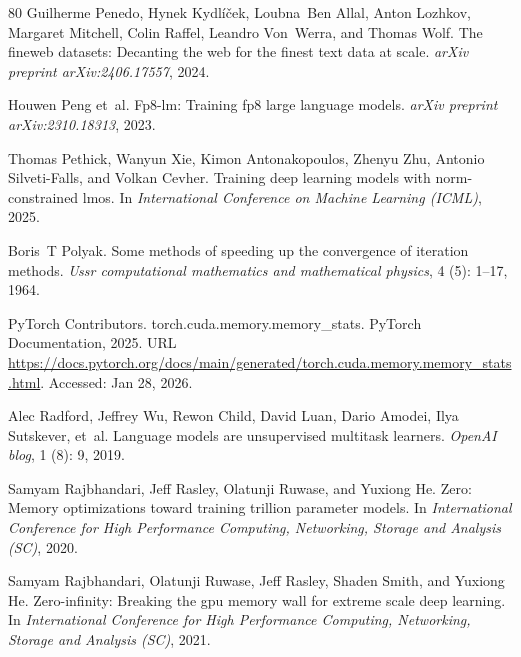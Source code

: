 \documentclass[10pt,twocolumn,letterpaper]{article}
\theoremstyle{plain}
\theoremstyle{definition}
\theoremstyle{remark}
\begin{document}
{\begin{thebibliography}{80}
Guilherme Penedo, Hynek Kydl{\'{i}}{\v{c}}ek, Loubna~Ben Allal, Anton Lozhkov,
  Margaret Mitchell, Colin Raffel, Leandro Von~Werra, and Thomas Wolf.
\newblock The fineweb datasets: Decanting the web for the finest text data at
  scale.
\newblock \emph{arXiv preprint arXiv:2406.17557}, 2024.

Houwen Peng et~al.
\newblock Fp8-lm: Training fp8 large language models.
\newblock \emph{arXiv preprint arXiv:2310.18313}, 2023.

Thomas Pethick, Wanyun Xie, Kimon Antonakopoulos, Zhenyu Zhu, Antonio
  Silveti-Falls, and Volkan Cevher.
\newblock Training deep learning models with norm-constrained lmos.
\newblock In \emph{International Conference on Machine Learning (ICML)}, 2025.

Boris~T Polyak.
\newblock Some methods of speeding up the convergence of iteration methods.
\newblock \emph{Ussr computational mathematics and mathematical physics},
  4 (5): 1--17, 1964.

{PyTorch Contributors}.
\newblock torch.cuda.memory.memory\_stats.
\newblock PyTorch Documentation, 2025.
\newblock URL
  \url{https://docs.pytorch.org/docs/main/generated/torch.cuda.memory.memory_stats.html}.
\newblock Accessed: Jan 28, 2026.

Alec Radford, Jeffrey Wu, Rewon Child, David Luan, Dario Amodei, Ilya
  Sutskever, et~al.
\newblock Language models are unsupervised multitask learners.
\newblock \emph{OpenAI blog}, 1 (8): 9, 2019.

Samyam Rajbhandari, Jeff Rasley, Olatunji Ruwase, and Yuxiong He.
\newblock Zero: Memory optimizations toward training trillion parameter models.
\newblock In \emph{International Conference for High Performance Computing,
  Networking, Storage and Analysis (SC)}, 2020.

Samyam Rajbhandari, Olatunji Ruwase, Jeff Rasley, Shaden Smith, and Yuxiong He.
\newblock Zero-infinity: Breaking the gpu memory wall for extreme scale deep
  learning.
\newblock In \emph{International Conference for High Performance Computing,
  Networking, Storage and Analysis (SC)}, 2021.


\end{thebibliography}}
\end{document}
